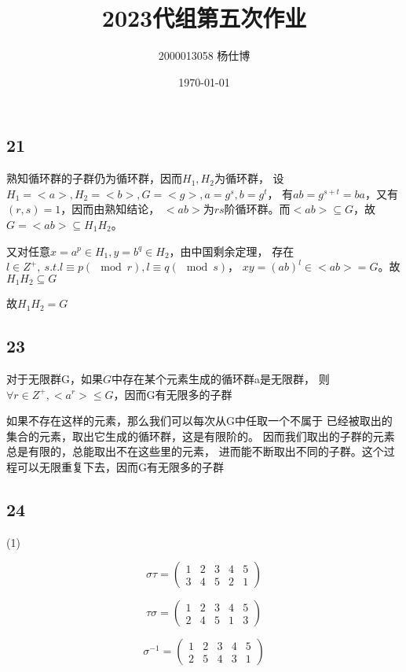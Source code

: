 \documentclass[UTF8]{ctexart}
\title{\vspace{-4cm}2023代组第五次作业}
\author{2000013058 杨仕博}
\date{\today}
\begin{document}
\maketitle

\subsection*{21}

熟知循环群的子群仍为循环群，因而$H_1, H_2$为循环群，
设$H_1 = <a>, H_2 = <b>, G = <g>, a = g^s, b = g^t$，
有$ab = g^{s + t} = ba$，又有$(r, s) = 1$，因而由熟知结论，
$<ab>$为$rs$阶循环群。而$<ab>\subseteq G$，故$G = <ab> \subseteq H_1H_2$。

又对任意$x=a^p\in H_1, y=b^q\in H_2$，由中国剩余定理，
存在$l\in Z^+,\ s.t.l\equiv p(\mod r), l\equiv q(\mod s)$，
$xy=(ab)^l\in <ab> = G$。故$H_1H_2\subseteq G$

故$H_1H_2 = G$

\subsection*{23}

对于无限群G，如果$G$中存在某个元素生成的循环群a是无限群，
则$\forall r\in Z^+, <a^r>\leq G$，因而G有无限多的子群

如果不存在这样的元素，那么我们可以每次从G中任取一个不属于
已经被取出的集合的元素，取出它生成的循环群，这是有限阶的。
因而我们取出的子群的元素总是有限的，总能取出不在这些里的元素，
进而能不断取出不同的子群。这个过程可以无限重复下去，因而G有无限多的子群

\subsection*{24}

(1)

\[
\sigma\tau = 
\begin{pmatrix}
    1 &2 &3 &4 &5\\
    3 &4 &5 &2 &1
\end{pmatrix}
\]

\[
\tau\sigma = 
\begin{pmatrix}
    1 &2 &3 &4 &5\\
    2 &4 &5 &1 &3
\end{pmatrix}
\]

\[
\sigma^{-1} = 
\begin{pmatrix}
    1 &2 &3 &4 &5\\
    2 &5 &4 &3 &1
\end{pmatrix}
\]
\end{document}
